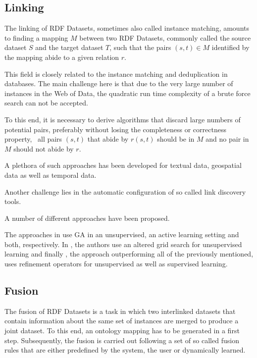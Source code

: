 \subsection{Linking}
\label{ssec:linking}

The linking of \ac{RDF} Datasets, sometimes also called instance matching, amounts to finding a mapping $M$ between two \ac{RDF} Datasets, commonly called the source dataset $S$ and the target dataset $T$, such that the pairs $(s,t)\in M$ identified by the mapping abide to a given relation $r$.

This field is closely related to the instance matching and deduplication in databases.
The main challenge here is that due to the very large number of instances in the Web of Data, the quadratic run time complexity of a brute force search can not be accepted.

To this end, it is necessary to derive algorithms that discard large numbers of potential pairs, preferably without losing the completeness or correctness property, \ie~all pairs $(s,t)$ that abide by $r(s,t)$ should be in $M$ and no pair in $M$ should not abide by $r$.

A plethora of such approaches has been developed for textual data\cite{drng14,xiao:p2008a,xiao:tds2011a,feng:vj2012a,isele:2011a,karakasidis:2012a}, geospatial data\cite{radon_2017, du:2013a,shivaprabhu:2017a} as well as temporal data\cite{allenalgebra}.

Another challenge lies in the automatic configuration of so called link discovery tools.

A number of different approaches have been proposed.

The approaches in \cite{NGLY12,NGO+13b,isele:2013a} use \acl{GA} in an unsupervised, an active learning setting and both, respectively.
In \cite{NGLY13}, the authors use an altered grid search for unsupervised learning and finally \cite{sherif:2017a}, the approach outperforming all of the previously mentioned, uses refinement operators for unsupervised as well as supervised learning.

\subsection{Fusion}
\label{ssec:fusion}

The fusion of \ac{RDF} Datasets is a task in which two interlinked datasets that contain information about the same set of instances are merged to produce a joint dataset.
To this end, an ontology mapping has to be generated in a first step.
Subsequently, the fusion is carried out following a set of so called fusion rules that are either predefined by the system, the user or dynamically learned.

